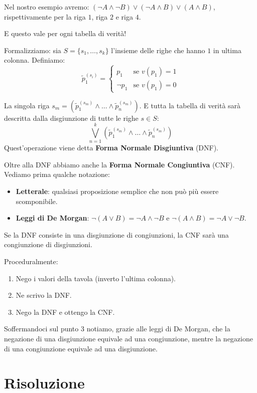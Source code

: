 \documentclass[12pt]{report}
\begin{document}
	Nel nostro esempio avremo: $(\neg A \land \neg B) \lor (\neg A \land B) \lor (A \land B)$, rispettivamente per la riga $1$, riga $2$ e riga $4$.
	
	E questo vale per ogni tabella di verità!
	
	Formalizziamo: sia $S = \{s_1, \dots, s_k\}$ l'insieme delle righe che hanno $1$ in ultima colonna.
	Definiamo:
	\[
	\tilde{p}_1^{(s_i)} = \begin{cases}
		p_1 & \text{se } v(p_1) = 1 \\
		\neg p_1 & \text{se } v(p_1) = 0
	\end{cases}
	\]
	
	La singola riga $s_m = (\tilde{p}_1^{(s_m)} \land \dots \land \tilde{p}_n^{(s_m)})$.
	E tutta la tabella di verità sarà descritta dalla disgiunzione di tutte le righe $s \in S$:
	\[
	\bigvee_{n=1}^{k} (\tilde{p}_1^{(s_m)} \land \dots \land \tilde{p}_n^{(s_m)})
	\]
	Quest'operazione viene detta \textbf{Forma Normale Disgiuntiva} (DNF).
	
	Oltre alla DNF abbiamo anche la \textbf{Forma Normale Congiuntiva} (CNF). Vediamo prima qualche notazione:
	\begin{itemize}
		\item \textbf{Letterale}: qualsiasi proposizione semplice che non può più essere scomponibile.
		\item \textbf{Leggi di De Morgan}: 
		$\neg (A \lor B) = \neg A \land \neg B$ e $\neg (A \land B) = \neg A \lor \neg B$.
	\end{itemize}
	
	Se la DNF consiste in una disgiunzione di congiunzioni, la CNF sarà una congiunzione di disgiunzioni.
	
	Proceduralmente:
	\begin{enumerate}
		\item Nego i valori della tavola (inverto l'ultima colonna).
		\item Ne scrivo la DNF.
		\item Nego la DNF e ottengo la CNF.
	\end{enumerate}
	
	Soffermandoci sul punto 3 notiamo, grazie alle leggi di De Morgan, che la negazione di una disgiunzione equivale ad una congiunzione, mentre la negazione di una congiunzione equivale ad una disgiunzione.
	
	\section{Risoluzione}
	
\end{document}
